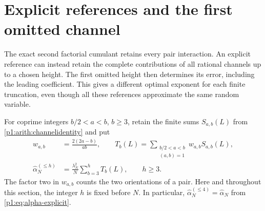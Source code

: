 \section{Explicit references and the first omitted channel}
\label{p13:channels:section}

The exact second factorial cumulant retains every pair interaction.  An
explicit reference can instead retain the complete contributions of all
rational channels up to a chosen height.  The first omitted height then
determines its error, including the leading coefficient.  This gives a
different optimal exponent for each finite truncation, even though all
these references approximate the same random variable.

For coprime integers $b/2<a<b$, $b\geq3$, retain the finite sums
$S_{a,b}(L)$ from \eqref{p1:arith:channelidentity} and put
\begin{equation}
 \begin{split}
 w_{a,b}&=\frac{2(2a-b)}{ab},\qquad
 T_b(L)=\sum_{\substack{b/2<a<b\\(a,b)=1}}w_{a,b}S_{a,b}(L),\\
 \widehat\alpha_N^{(\leq h)}
   &=\frac{\lambda_N^2}{N}\sum_{b=3}^{h}T_b(L),\qquad h\geq3.
 \end{split}
 \label{p13:channels:definitions}
\end{equation}
The factor two in $w_{a,b}$ counts the two orientations of a pair.
Here and throughout this section, the integer $h$ is fixed before $N$.
In particular,
$\widehat\alpha_N^{(\leq4)}=\widehat\alpha_N$ from
\eqref{p1:eq:alpha-explicit}.

